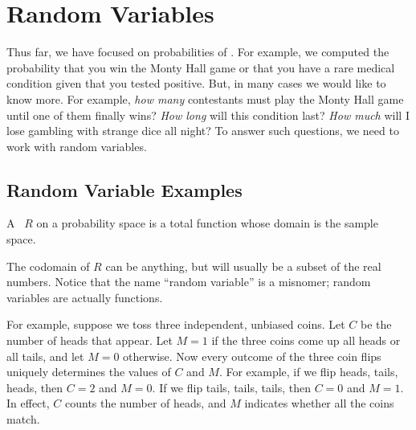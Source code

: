 \chapter{Random Variables}\label{ran_var_chap}

Thus far, we have focused on probabilities of .  For
example, we computed the probability that you win the Monty Hall game
or that you have a rare medical condition given that you tested
positive.  But, in many cases we would like to know more.  For
example, \emph{how many} contestants must play the Monty Hall game
until one of them finally wins?  \emph{How long} will this condition
last?  \emph{How much} will I lose gambling with strange dice all
night?  To answer such questions, we need to work with random
variables.

\section{Random Variable Examples}\label{ran_var_examples_sec}

\begin{definition}
  A ~$R$ on a probability space is a total function
  whose domain is the sample space.
\end{definition}
The codomain of $R$ can be anything, but will usually be a subset of
the real numbers.  Notice that the name ``random variable'' is a
misnomer; random variables are actually functions.

For example, suppose we toss three independent, unbiased coins.  Let
$C$ be the number of heads that appear.  Let $M = 1$ if the three
coins come up all heads or all tails, and let $M = 0$ otherwise.  Now
every outcome of the three coin flips uniquely determines the values
of $C$ and $M$.  For example, if we flip heads, tails, heads, then $C
= 2$ and $M = 0$.  If we flip tails, tails, tails, then $C = 0$ and $M
= 1$.  In effect, $C$ counts the number of heads, and $M$ indicates
whether all the coins match.

